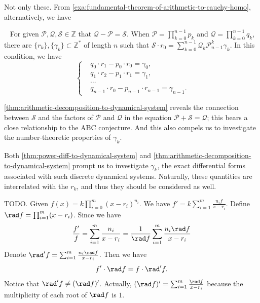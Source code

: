 Not only these. From \cref{exa:fundamental-theorem-of-arithmetic-to-cauchy-homo}, alternatively, we have
\begin{theorem}~\label{thm:arithmetic-decomposition-to-dynamical-system}
	For given $\mathcal{P}, \mathcal{Q}, \mathcal{S} \in \mathbb{Z}$ that $\mathcal{Q} - \mathcal{P} = \mathcal{S}$.\newline
	When $\mathcal{P} = \prod_{k=0}^{n-1}p_k$ and $\mathcal{Q} = \prod_{k=0}^{n-1}q_k$, there are $\{r_k\}, \{\gamma_k\} \subset\mathbb{Z}^{*}$ of length $n$ such that $\mathcal{S}\cdot r_0 = \sum_{k=0}^{n-1}\mathcal{Q}_k\mathcal{P}_{n-1}^{k}\gamma_k$. In this condition, we have
	\begin{equation}~\label{equ:equation-system-of-power-diff-to-dynamical-system}
		\left\{\begin{aligned}
		&q_{0}\cdot r_{1} - p_{0} \cdot r_{0} = \gamma_{0},\\
		&q_{1}\cdot r_{2} - p_{1} \cdot r_{1} = \gamma_{1},\\
		&\cdots \\
		&q_{n-1}\cdot r_{0} - p_{n-1} \cdot r_{n-1} = \gamma_{n-1}.
	\end{aligned}\right.
	\end{equation}
\end{theorem}
\cref{thm:arithmetic-decomposition-to-dynamical-system} reveals the connection between $\mathcal{S}$ and the factors of $\mathcal{P}$ and $\mathcal{Q}$ in the equation $\mathcal{P} + \mathcal{S} = \mathcal{Q}$; this bears a close relationship to the ABC conjecture. And this also compels us to investigate the number-theoretic properties of $\gamma_k$.

Both \cref{thm:power-diff-to-dynamical-system} and \cref{thm:arithmetic-decomposition-to-dynamical-system} prompt us to investigate $\gamma_k$, the exact differential forms associated with such discrete dynamical systems. Naturally, these quantities are interrelated with the $r_k$, and thus they should be considered as well.

TODO.
\newpage
Given $f(x) = k\prod_{i=0}^{m}(x - r_i)^{n_i}$. We have $f' = k\sum_{i=1}^{m}\frac{n_i f}{x - r_i}$.
Define $\rad f = \prod_{i=1}^{m}(x - r_i)$. Since we have
\[ \frac{f'}{f} = \sum_{i=1}^{m}\frac{n_i}{x - r_i} = \frac{1}{\rad f}\sum_{i=1}^{m}\frac{n_i\rad f}{x - r_i} \]
Denote $\rad' f = \sum_{i=1}^{m}\frac{n_i\rad f}{x - r_i}$. Then we have
\[ f'\cdot \rad f = f\cdot \rad'f. \]
Notice that $\rad' f \ne (\rad f)'$. Actually, $(\rad f)' = \sum_{i=1}^{m}\frac{\rad f}{x - r_i}$ because the multiplicity of each root of $\rad f$ is $1$.


